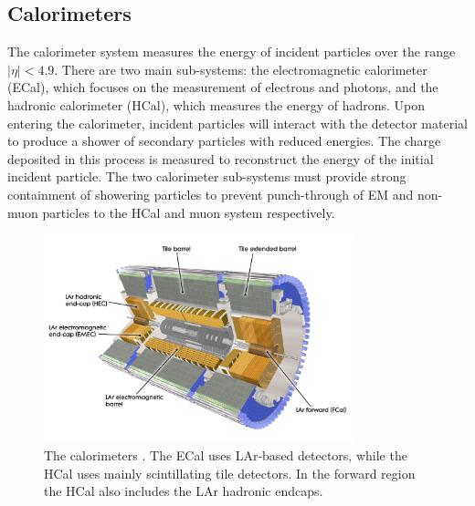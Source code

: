 \subsection{Calorimeters}\label{sec:atlas_calorimeter}

The calorimeter system measures the energy of incident particles over the range $|\eta| < 4.9$.
There are two main sub-systems: the electromagnetic calorimeter (ECal), which focuses on the measurement of electrons and photons, and the hadronic calorimeter (HCal), which measures the energy of hadrons.
Upon entering the calorimeter, incident particles will interact with the detector material to produce a shower of secondary particles with reduced energies. 
The charge deposited in this process is measured to reconstruct the energy of the initial incident particle.
The two calorimeter sub-systems must provide strong containment of showering particles to prevent punch-through of EM and non-muon particles to the HCal and muon system respectively.





%
\begin{figure}[!htpb]
  \centering
  \includegraphics[width=0.8\textwidth]{chapters/2.detector/figs/atlas_calos.jpg}
  \caption{
    The \ATLAS calorimeters \cite{atlascalo}.
    The ECal uses LAr-based detectors, while the HCal uses mainly scintillating tile detectors.
    In the forward region the HCal also includes the LAr hadronic endcaps.
  }
  \label{fig:atlas_calos}
\end{figure}
%


